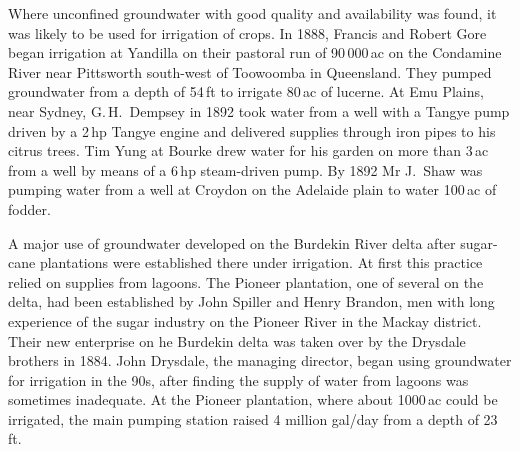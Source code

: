 Where unconfined groundwater with good quality and availability was
found, it was likely to be used for irrigation of crops.  In 1888,
Francis and Robert Gore  began irrigation at Yandilla
on their pastoral run of 90\,000\,ac on the Condamine River
 near Pittsworth 
south-west of Toowoomba in Queensland.  They pumped groundwater from a
depth of 54\,ft to irrigate 80\,ac of lucerne. At Emu Plains,
 near Sydney, G.\,H.~Dempsey  in 1892 took water from a well with a Tangye pump
 driven by a 2\,hp Tangye engine and delivered
supplies through iron pipes to his citrus trees.  Tim Yung at Bourke
 drew water for his garden on more than 3\,ac from
a well by means of a 6\,hp steam-driven pump. By 1892 Mr J.~Shaw was
pumping water from a well at Croydon  on the
Adelaide plain to water 100\,ac of fodder.

A major use of groundwater developed on the Burdekin River
 delta after sugar-cane plantations were
established there under irrigation.  At first this practice relied on
supplies from lagoons.  The Pioneer plantation, one of several on the
delta, had been established by John Spiller and  Henry
Brandon,  men with long experience of the sugar
industry on the Pioneer River  in the Mackay
district.  Their new enterprise on he Burdekin delta was taken over by
the Drysdale brothers  in 1884.  John Drysdale,
the managing director, began using groundwater for irrigation in the
90s, after finding the supply of water from lagoons was sometimes
inadequate.  At the Pioneer plantation, where about 1000\,ac could be
irrigated, the main pumping station raised 4 million gal/day from a
depth of 23\,ft.

